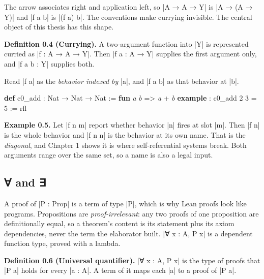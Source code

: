 \documentclass{memoir}
\begin{document}
The arrow associates right and application left, so \LeanVerb|A → A → Y| is \LeanVerb|A → (A → Y)|
and \LeanVerb|f a b| is \LeanVerb|(f a) b|. The conventions make currying invisible. The central
object of this thesis has this shape.

\textbf{Definition 0.4 (Currying).} A two-argument function into \LeanVerb|Y| is represented
curried as \LeanVerb|f : A → A → Y|. Then \LeanVerb|f a : A → Y| supplies the first argument only,
and \LeanVerb|f a b : Y| supplies both.

Read \LeanVerb|f a| as the \emph{behavior indexed by} \LeanVerb|a|, and \LeanVerb|f a b| as that behavior at
\LeanVerb|b|.

\begin{LeanVerbatim}
\textbf{def} c0_add : Nat → Nat → Nat := \textbf{fun} \textit{a} \textit{b} => \textit{a} + \textit{b}
\textbf{example} : c0_add 2 3 = 5 := rfl

\end{LeanVerbatim}


\textbf{Example 0.5.} Let \LeanVerb|f n m| report whether behavior \LeanVerb|n| fires at slot \LeanVerb|m|. Then
\LeanVerb|f n| is the whole behavior and \LeanVerb|f n n| is the behavior at its own name. That is
the \emph{diagonal}, and Chapter 1 shows it is where self-referential systems break.
Both arguments range over the same set, so a name is also a legal input.



\subsection{∀ and ∃}\label{Two--Schemas--of--Impossibility-005F-005F-005F--Machine--Checked--Limits--of--Trustworthy--Machine--Learning-005F-005F-005F--and--Why--They--Tighten--with--Capability----Preliminaries----How--to--read--the--Lean--4-----005F-005F-005F--and---005F-005F-005F}

A proof of \LeanVerb|P : Prop| is a term of type \LeanVerb|P|, which is why Lean proofs look like
programs. Propositions are \emph{proof-irrelevant}: any two proofs of one proposition
are definitionally equal, so a theorem's content is its statement plus its axiom
dependencies, never the term the elaborator built. \LeanVerb|∀ x : A, P x| is a dependent
function type, proved with a lambda.

\textbf{Definition 0.6 (Universal quantifier).} \LeanVerb|∀ x : A, P x| is the type of proofs
that \LeanVerb|P a| holds for every \LeanVerb|a : A|. A term of it maps each \LeanVerb|a| to a proof of \LeanVerb|P a|.
\end{document}
